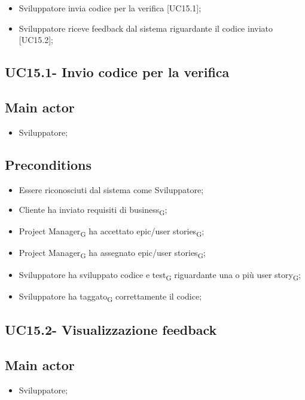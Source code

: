 \documentclass{article}
\begin{document}
        \begin{itemize}
            \item Sviluppatore invia codice per la verifica [UC15.1];

            \item Sviluppatore riceve feedback dal sistema riguardante il codice inviato [UC15.2];
        \end{itemize}
        
    \subsection{UC15.1- Invio codice per la verifica}
    \subsection*{Main actor}
        \begin{itemize}
            \item Sviluppatore;
        \end{itemize}
        
    \subsection*{Preconditions}
        \begin{itemize}
            \item Essere riconosciuti dal sistema come Sviluppatore;
            \item Cliente ha inviato requisiti di business\textsubscript{G};
            \item Project Manager\textsubscript{G} ha accettato epic/user stories\textsubscript{G};
            \item Project Manager\textsubscript{G} ha assegnato epic/user stories\textsubscript{G};
            \item Sviluppatore ha sviluppato codice e test\textsubscript{G} riguardante una o più user story\textsubscript{G};
            \item Sviluppatore ha taggato\textsubscript{G} correttamente il codice;
        \end{itemize}
        
    \subsection{UC15.2- Visualizzazione feedback}
    \subsection*{Main actor}
        \begin{itemize}
            \item Sviluppatore;
        \end{itemize}
        
\end{document}
